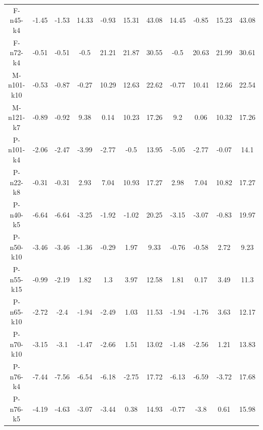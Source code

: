 \documentclass[11pt]{article} %
\begin{document}
\begin{enumerate}
\begin{landscape}
\begin{table}[p]
\begin{small}
\begin{tabular}{ccccccccccc}
F-n45-k4&-1.45&-1.53&14.33&-0.93&15.31&43.08&14.45&-0.85&15.23&43.08\\
F-n72-k4&-0.51&-0.51&-0.5&21.21&21.87&30.55&-0.5&20.63&21.99&30.61\\
M-n101-k10&-0.53&-0.87&-0.27&10.29&12.63&22.62&-0.77&10.41&12.66&22.54\\
M-n121-k7&-0.89&-0.92&9.38&0.14&10.23&17.26&9.2&0.06&10.32&17.26\\
P-n101-k4&-2.06&-2.47&-3.99&-2.77&-0.5&13.95&-5.05&-2.77&-0.07&14.1\\
P-n22-k8&-0.31&-0.31&2.93&7.04&10.93&17.27&2.98&7.04&10.82&17.27\\
P-n40-k5&-6.64&-6.64&-3.25&-1.92&-1.02&20.25&-3.15&-3.07&-0.83&19.97\\
P-n50-k10&-3.46&-3.46&-1.36&-0.29&1.97&9.33&-0.76&-0.58&2.72&9.23\\
P-n55-k15&-0.99&-2.19&1.82&1.3&3.97&12.58&1.81&0.17&3.49&11.3\\
P-n65-k10&-2.72&-2.4&-1.94&-2.49&1.03&11.53&-1.94&-1.76&3.63&12.17\\
P-n70-k10&-3.15&-3.1&-1.47&-2.66&1.51&13.02&-1.48&-2.56&1.21&13.83\\
P-n76-k4&-7.44&-7.56&-6.54&-6.18&-2.75&17.72&-6.13&-6.59&-3.72&17.68\\
P-n76-k5&-4.19&-4.63&-3.07&-3.44&0.38&14.93&-0.77&-3.8&0.61&15.98\\
\bottomrule
\end{tabular}
\end{small}
\end{table}%


\end{landscape}
\end{enumerate}
\end{document}
